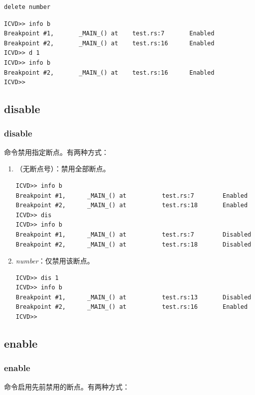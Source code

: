 \begin{lstlisting}
delete number
\end{lstlisting}

\begin{lstlisting}
ICVD>> info b
Breakpoint #1,       _MAIN_() at    test.rs:7       Enabled
Breakpoint #2,       _MAIN_() at    test.rs:16      Enabled
ICVD>> d 1
ICVD>> info b
Breakpoint #2,       _MAIN_() at    test.rs:16      Enabled
ICVD>>
\end{lstlisting}

\subsection{disable}
\subsubsection*{disable}

 命令禁用指定断点。有两种方式：

\begin{enumerate}
  \item {}（无断点号）：禁用全部断点。
\begin{lstlisting}
ICVD>> info b
Breakpoint #1,      _MAIN_() at          test.rs:7        Enabled
Breakpoint #2,      _MAIN_() at          test.rs:18       Enabled
ICVD>> dis
ICVD>> info b
Breakpoint #1,      _MAIN_() at          test.rs:7        Disabled
Breakpoint #2,      _MAIN_() at          test.rs:18       Disabled
\end{lstlisting}

  \item {} \textit{number}：仅禁用该断点。
\begin{lstlisting}
ICVD>> dis 1
ICVD>> info b
Breakpoint #1,      _MAIN_() at          test.rs:13       Disabled
Breakpoint #2,      _MAIN_() at          test.rs:16       Enabled
ICVD>>
\end{lstlisting}
\end{enumerate}

\subsection{enable}
\subsubsection*{enable}

 命令启用先前禁用的断点。有两种方式：

